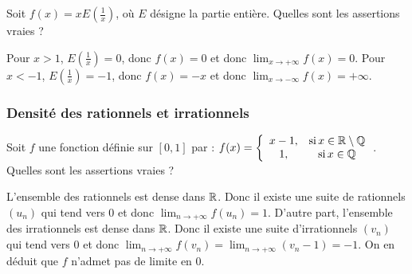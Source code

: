 \begin{question}
 
Soit $f(x)= xE(\frac{1}{x})$, où $E$ désigne la partie entière. Quelles sont les assertions vraies ?
\begin{answers}

    
    
    
    
\end{answers}
\begin{explanations}
Pour $x>1$,  $E(\frac{1}{x})=0$, donc $f(x)=0$ et donc  $\lim_{x\to +\infty} f(x)=0$. 
Pour $x<-1$,  $E(\frac{1}{x})=-1$, donc $f(x)=-x$ et donc  $\lim_{x\to -\infty} f(x)=+\infty$. 
\end{explanations}

\end{question} 
 
 
\subsubsection{Densité des rationnels et irrationnels}
  

\begin{question}
 
Soit  $f$ une fonction définie sur $[0,1]$ par : $f(x)=\left\{\begin{array}{cc}x-1,& \mbox{si} \, x \in \mathbb{R} \setminus \mathbb{Q}\\ 1,&  \mbox{si} \, x \in \mathbb{Q}  \end{array}\right.$. Quelles sont les assertions vraies ?
\begin{answers}

    
    
    
    

\end{answers}
\begin{explanations}
L'ensemble des rationnels est dense dans $\mathbb{R}$. Donc il existe une suite de rationnels $(u_n)$ qui tend vers $0$ et donc  $\lim_{n\to +\infty} f(u_n)=1$.  D'autre part, l'ensemble des irrationnels est dense dans $\mathbb{R}$.  Donc il existe une suite d'irrationnels $(v_n)$ qui tend vers $0$ et donc  $\lim_{n\to +\infty} f(v_n)=\lim_{n\to +\infty} (v_n-1) = -1 $. On en déduit que  $f$ n'admet pas de limite en $0$.
\end{explanations}

\end{question}



